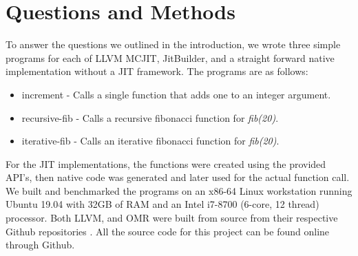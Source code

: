 \section{Questions and Methods}
\label{sec:methodology}
To answer the questions we outlined in the introduction, we wrote three simple programs for each of LLVM MCJIT, JitBuilder, and a straight forward native implementation without a JIT framework.
The programs are as follows:
\begin{itemize}
    \item increment - Calls a single function that adds one to an integer argument.
    \item recursive-fib - Calls a recursive fibonacci function for \textit{fib(20)}.
    \item iterative-fib - Calls an iterative fibonacci function for \textit{fib(20)}.  
\end{itemize}
For the JIT implementations, the functions were created using the provided API's, then native code was generated and later used for the actual function call.
We built and benchmarked the programs on an x86-64 Linux workstation running Ubuntu 19.04 with 32GB of RAM and an Intel i7-8700 (6-core, 12 thread) processor. 
Both LLVM, and OMR were built from source from their respective Github repositories \cite{llvmCommit, omrCommit}.
All the source code for this project can be found online through Github\cite{projectGithub}.
